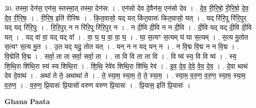 \documentclass[17pt]{extarticle}
\begin{document}
30. तस्मा॒ देन॑स॒ एन॑स॒ स्तस्मा॒त् तस्मा॒ देन॑सः । . एन॑सो देव दे॒वैन॑स॒ एन॑सो देव । . दे॒व॒ री॒रि॒षो॒ री॒रि॒षो॒ दे॒व॒ दे॒व॒ री॒रि॒षः॒ । . री॒रि॒ष॒ इति॑ रीरिषः । . कि॒त॒वासो॒ यद् यत् कि॑त॒वासः॑ कित॒वासो॒ यत् । . यद् रि॑रि॒पू रि॑रि॒पुर् यद् यद् रि॑रि॒पुः । . रि॒रि॒पुर् न न रि॑रि॒पू रि॑रि॒पुर् न । . न दी॒वि दी॒वि न न दी॒वि । . दी॒वि यद् यद् दी॒वि दी॒वि यत् । . यद् वा॑ वा॒ यद् यद् वा᳚ । . वा॒ घ॒ घ॒ वा॒ वा॒ घ॒ । . घा॒ स॒त्यꣳ स॒त्यम् घ॑ घा स॒त्यम् । . स॒त्य मु॒तोत स॒त्यꣳ स॒त्य मु॒त । . उ॒त यद् यदु॒ तोत यत् । . यन् न न यद् यन् न । . न वि॒द्म वि॒द्म न न वि॒द्म । . वि॒द्मेति॑ वि॒द्म । . सर्वा॒ ता ता सर्वा॒ सर्वा॒ ता । . ता वि वि ता ता वि । . वि ष्य॑ स्य॒ वि वि ष्य॑ । . स्य॒ शि॒थि॒रा शि॑थि॒रा स्य॑ स्य शिथि॒रा । . शि॒थि॒ रेवे॑व शिथि॒रा शि॑थि॒ रेव॑ । . इ॒व॒ दे॒व॒ दे॒वे॒ वे॒व॒ दे॒व॒ । . दे॒वा थाथ॑ देव दे॒वाथ॑ । . अथा॑ ते ते॒ अथाथा॑ ते । . ते॒ स्या॒म॒ स्या॒म॒ ते॒ ते॒ स्या॒म॒ । . स्या॒म॒ व॒रु॒ण॒ व॒रु॒ण॒ स्या॒म॒ स्या॒म॒ व॒रु॒ण॒ । . व॒रु॒ण॒ प्रि॒यासः॑ प्रि॒यासो॑ वरुण वरुण प्रि॒यासः॑ । . प्रि॒यास॒ इति॑ प्रि॒यासः॑ । \newline

\textbf{Ghana Paata } \newline
\end{document}
